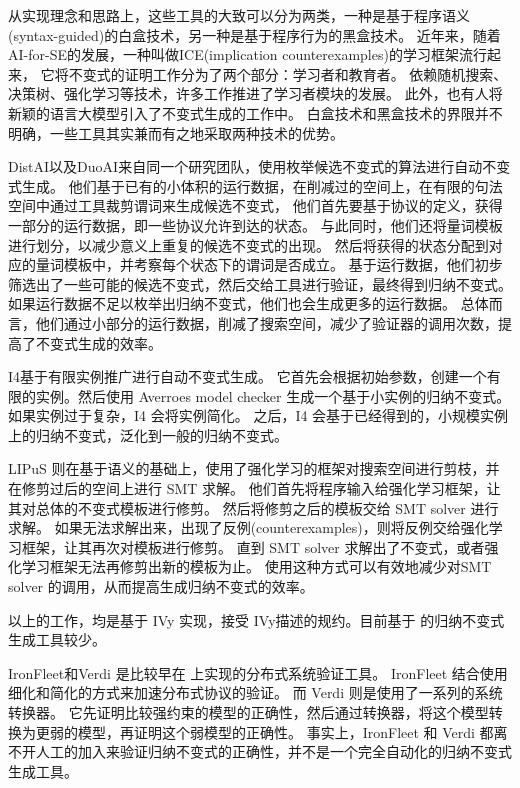 从实现理念和思路上，这些工具的大致可以分为两类，一种是基于程序语义(syntax-guided)\cite{syntax}的白盒技术，另一种是基于程序行为的黑盒技术。
近年来，随着 AI-for-SE的发展，一种叫做ICE\cite{ICE}(implication counterexamples)的学习框架流行起来，
它将不变式的证明工作分为了两个部分：学习者和教育者。
依赖随机搜索、决策树\cite{garg2016learning}、强化学习\cite{LIPuS}等技术，许多工作推进了学习者模块的发展。
此外，也有人将新颖的语言大模型引入了不变式生成的工作中\cite{llm}。
白盒技术和黑盒技术的界限并不明确，一些工具其实兼而有之地采取两种技术的优势。

DistAI\cite{DistAI}以及DuoAI\cite{DuoAI}来自同一个研究团队，使用枚举候选不变式的算法进行自动不变式生成。
他们基于已有的小体积的运行数据，在削减过的空间上，在有限的句法空间中通过工具裁剪谓词来生成候选不变式，
他们首先要基于协议的定义，获得一部分的运行数据，即一些协议允许到达的状态。
与此同时，他们还将量词模板进行划分，以减少意义上重复的候选不变式的出现。
然后将获得的状态分配到对应的量词模板中，并考察每个状态下的谓词是否成立。
基于运行数据，他们初步筛选出了一些可能的候选不变式，然后交给工具进行验证，最终得到归纳不变式。
如果运行数据不足以枚举出归纳不变式，他们也会生成更多的运行数据。
总体而言，他们通过小部分的运行数据，削减了搜索空间，减少了验证器的调用次数，提高了不变式生成的效率。

I4\cite{I4}基于有限实例推广进行自动不变式生成。
它首先会根据初始参数，创建一个有限的实例。然后使用 Averroes model checker \cite{goel2019model}生成一个基于小实例的归纳不变式。
如果实例过于复杂，I4 会将实例简化。
之后，I4 会基于已经得到的，小规模实例上的归纳不变式，泛化到一般的归纳不变式。

LIPuS 则在基于语义的基础上，使用了强化学习的框架对搜索空间进行剪枝，并在修剪过后的空间上进行 SMT 求解。
他们首先将程序输入给强化学习框架，让其对总体的不变式模板进行修剪。
然后将修剪之后的模板交给 SMT solver 进行求解。
如果无法求解出来，出现了反例(counterexamples)，则将反例交给强化学习框架，让其再次对模板进行修剪。
直到 SMT solver 求解出了不变式，或者强化学习框架无法再修剪出新的模板为止。
使用这种方式可以有效地减少对SMT solver 的调用，从而提高生成归纳不变式的效率。

以上的工作，均是基于 IVy 实现，接受 IVy描述的规约。目前基于 \TLA 的归纳不变式生成工具较少。

IronFleet\cite{IronFleet}和Verdi\cite{Verdi} 是比较早在 \TLA 上实现的分布式系统验证工具。
IronFleet 结合使用细化和简化的方式来加速分布式协议的验证。
而 Verdi 则是使用了一系列的系统转换器。
它先证明比较强约束的模型的正确性，然后通过转换器，将这个模型转换为更弱的模型，再证明这个弱模型的正确性。
事实上，IronFleet 和 Verdi 都离不开人工的加入来验证归纳不变式的正确性，并不是一个完全自动化的归纳不变式生成工具。

